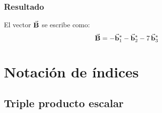 \documentclass[12pt]{beamer}
\begin{document}
\begin{frame}
\frametitle{Resultado}
El vector $\va{B}$ se escribe como:
\pause
\begin{align*}
\va{B} = - \va{b}_{1}^{*} - \va{b}_{2}^{*} - 7 \, \va{b}_{3}^{*} 
\end{align*}
\end{frame}

\section{Notación de índices}
\subsection{Triple producto escalar}
\end{document}
